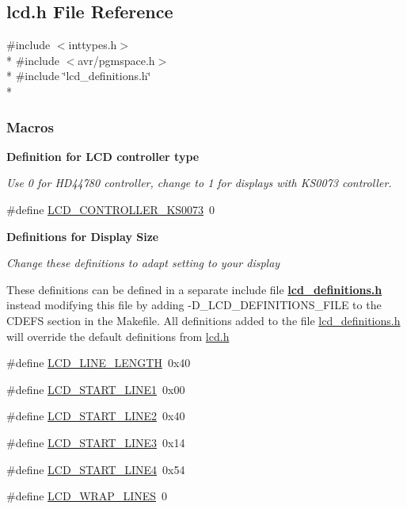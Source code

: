 \hypertarget{a00002}{}\subsection{lcd.\+h File Reference}
\label{a00002}
{\ttfamily \#include $<$inttypes.\+h$>$}\\*
{\ttfamily \#include $<$avr/pgmspace.\+h$>$}\\*
{\ttfamily \#include \char`\"{}lcd\+\_\+definitions.\+h\char`\"{}}\\*
\subsubsection*{Macros}
\begin{Indent}{\bf Definition for L\+CD controller type}\par
{\em Use 0 for H\+D44780 controller, change to 1 for displays with K\+S0073 controller. }\begin{DoxyCompactItemize}
\item 
\#define \hyperlink{a00006_ga63574b03f72a197aeee823aae95dc3b7}{L\+C\+D\+\_\+\+C\+O\+N\+T\+R\+O\+L\+L\+E\+R\+\_\+\+K\+S0073}~0
\end{DoxyCompactItemize}
\end{Indent}
\begin{Indent}{\bf Definitions for Display Size}\par
{\em Change these definitions to adapt setting to your display

These definitions can be defined in a separate include file {\bfseries \hyperlink{a00003}{lcd\+\_\+definitions.\+h}} instead modifying this file by adding -\/\+D\+\_\+\+L\+C\+D\+\_\+\+D\+E\+F\+I\+N\+I\+T\+I\+O\+N\+S\+\_\+\+F\+I\+LE to the C\+D\+E\+FS section in the Makefile. All definitions added to the file \hyperlink{a00003}{lcd\+\_\+definitions.\+h} will override the default definitions from \hyperlink{a00002}{lcd.\+h} }\begin{DoxyCompactItemize}
\item 
\#define \hyperlink{a00006_gae59a728d9dee9f12c817b29d38746ed9}{L\+C\+D\+\_\+\+L\+I\+N\+E\+\_\+\+L\+E\+N\+G\+TH}~0x40
\item 
\#define \hyperlink{a00006_gabd056d70a1488ea2eb1aef87e248e234}{L\+C\+D\+\_\+\+S\+T\+A\+R\+T\+\_\+\+L\+I\+N\+E1}~0x00
\item 
\#define \hyperlink{a00006_ga7b317b21058ef031716ba040ef75430a}{L\+C\+D\+\_\+\+S\+T\+A\+R\+T\+\_\+\+L\+I\+N\+E2}~0x40
\item 
\#define \hyperlink{a00006_gae7cca16353048a062baeb3a52da55249}{L\+C\+D\+\_\+\+S\+T\+A\+R\+T\+\_\+\+L\+I\+N\+E3}~0x14
\item 
\#define \hyperlink{a00006_gab1b73e05bdb5cc12cdff5a1cf6c4f2a2}{L\+C\+D\+\_\+\+S\+T\+A\+R\+T\+\_\+\+L\+I\+N\+E4}~0x54
\item 
\#define \hyperlink{a00006_gadb35ff6cb242e48ba0545ea919ffc5d3}{L\+C\+D\+\_\+\+W\+R\+A\+P\+\_\+\+L\+I\+N\+ES}~0
\end{DoxyCompactItemize}
\end{Indent}
